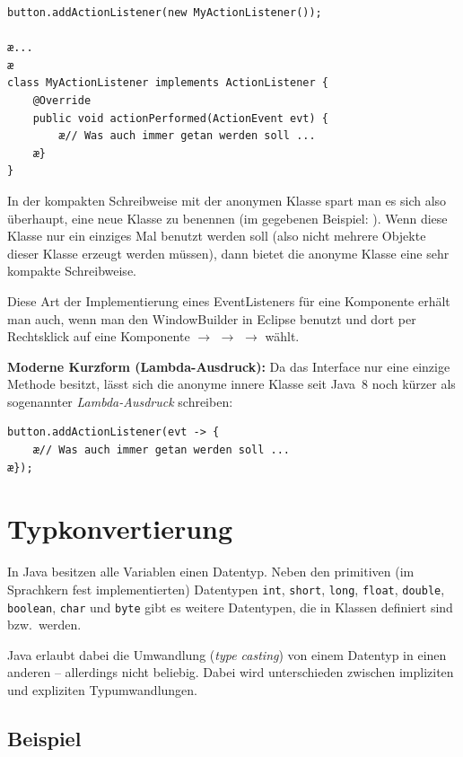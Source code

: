 \begin{compactenum}[1.]
\begin{lstlisting}
button.addActionListener(new MyActionListener());
   		
æ...
æ   		
class MyActionListener implements ActionListener {
    @Override
    public void actionPerformed(ActionEvent evt) {
        æ// Was auch immer getan werden soll ...
    æ}
}
\end{lstlisting}

In der kompakten Schreibweise mit der anonymen Klasse spart man es sich also
überhaupt, eine neue Klasse zu benennen (im gegebenen Beispiel:
). Wenn diese Klasse nur ein einziges Mal benutzt
werden soll (also nicht mehrere Objekte dieser Klasse erzeugt werden müssen),
dann bietet die anonyme Klasse eine sehr kompakte Schreibweise.

Diese Art der Implementierung eines EventListeners für eine Komponente erhält
man auch, wenn man den WindowBuilder in Eclipse benutzt und dort per Rechtsklick
auf eine Komponente $\rightarrow$  $\rightarrow$
 $\rightarrow$  wählt.

\textbf{Moderne Kurzform (Lambda-Ausdruck):} Da das Interface
 nur eine einzige Methode besitzt, lässt sich die
anonyme innere Klasse seit Java~8 noch kürzer als sogenannter
\emph{Lambda-Ausdruck} schreiben:

\begin{lstlisting}
button.addActionListener(evt -> {
    æ// Was auch immer getan werden soll ...
æ});
\end{lstlisting}
\end{compactenum}

\section{Typkonvertierung}

In Java besitzen alle Variablen einen Datentyp. Neben den primitiven (im
Sprachkern fest implementierten) Datentypen \lstinline|int|, \lstinline|short|,
\lstinline|long|, \lstinline|float|, \lstinline|double|, \lstinline|boolean|,
\lstinline|char| und \lstinline|byte| gibt es weitere Datentypen, die in Klassen
definiert sind bzw.\ werden.

Java erlaubt dabei die Umwandlung (\emph{type casting}) von einem Datentyp in
einen anderen -- allerdings nicht beliebig. Dabei wird unterschieden zwischen
impliziten und expliziten Typumwandlungen.

\subsection{Beispiel}

